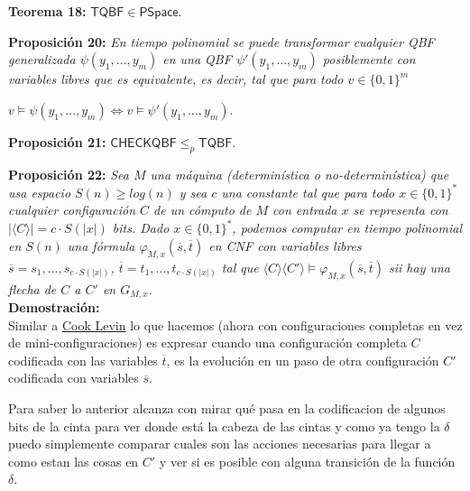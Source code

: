 \documentclass{article}
\begin{document}
\begin{flushleft}
  \textbf{Teorema 18:}
  $\mathsf{TQBF} \in \mathsf{PSpace}$.
\end{flushleft}

\begin{flushleft}
  \textbf{Proposición 20:}
  \textit{En tiempo polinomial se puede transformar cualquier QBF generalizada $\psi (y_1, \dots, y_m)$ 
  en una QBF $\psi'(y_1, \dots, y_m)$ posiblemente con variables libres que es equivalente, es decir, tal 
  que para todo $v \in \{ 0,1 \}^m$}
\end{flushleft}
\begin{center}
  $v \models \psi(y_1, \dots, y_m) \iff v \models \psi'(y_1, \dots, y_m)$.
\end{center}

\begin{flushleft}
  \textbf{Proposición 21:}
  $\mathsf{CHECKQBF} \leq_p \mathsf{TQBF}$.
\end{flushleft}

\begin{flushleft}
  \textbf{\hypertarget{prop22}{Proposición 22:}}
  \textit{Sea $M$ una máquina (determinística o no-determinística) que usa espacio $S(n) \geq log(n)$ y sea
  $c$ una constante tal que para todo $x \in \{0,1\}^*$ cualquier configuración $C$ de un cómputo de $M$ con
  entrada $x$ se representa con $|\langle C \rangle| = c \cdot S(|x|)$ bits. Dado $x \in \{0,1\}^*$, podemos
  computar en tiempo polinomial en $S(n)$ una fórmula $\varphi_{M,x}(\overline{s}, \overline{t})$ en CNF con
  variables libres $\overline{s} = s_1, \dots, s_{c \cdot S(|x|)}$, $\overline{t} = t_1, \dots, t_{c \cdot
  S(|x|)}$ tal que $\langle C \rangle \langle C' \rangle \models \varphi_{M,x}(\overline{s}, \overline{t})$
  sii hay una flecha de $C$ a $C'$ en $G_{M,x}$.} \\[0.5em]

  \textbf{\textcolor{Mulberry}{Demostración:}} \\[0.5em]

  Similar a \hyperlink{cooklevin}{\textcolor{Rhodamine}{Cook Levin}} lo que hacemos (ahora con configuraciones 
  completas en vez de mini-configuraciones) es expresar cuando una configuración completa $C$ codificada con las 
  variables $\overline{t}$, es la evolución en un paso de otra configuración $C'$ codificada con variables $\overline{s}$.
  
  Para saber lo anterior alcanza con mirar qué pasa en la codificacion de algunos bits de la cinta para ver donde 
  está la cabeza de las cintas y como ya tengo la $\delta$ puedo simplemente comparar cuales son las acciones necesarias
  para llegar a como estan las cosas en $C'$ y ver si es posible con alguna transición de la función $\delta$.
\end{flushleft} 
\end{document}
